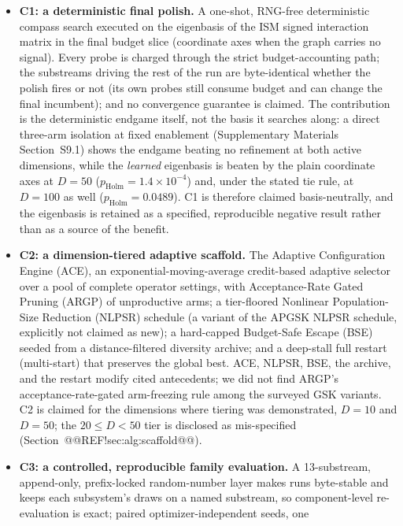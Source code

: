 \documentclass[10pt,a4paper]{article}
\begin{document}
\begin{itemize}[leftmargin=*,labelsep=4.9mm]
\item \textbf{C1: a deterministic final polish.} A one-shot, RNG-free
  deterministic compass search executed on the eigenbasis of the ISM
  signed interaction matrix in the final budget slice (coordinate axes
  when the graph carries no signal). Every probe is charged through
  the strict budget-accounting path; the substreams driving the rest of
  the run are byte-identical whether the polish fires or not (its own
  probes still consume budget and can change the final incumbent); and
  no convergence guarantee is claimed. The contribution is the deterministic
  endgame itself, not the basis it searches along: a direct three-arm isolation
  at fixed enablement (Supplementary Materials
  Section~S9.1) shows the endgame beating no refinement at
  both active dimensions, while the \emph{learned} eigenbasis is beaten by the
  plain coordinate axes at $D = 50$ ($p_{\mathrm{Holm}} = 1.4\times10^{-4}$)
  and, under the stated tie rule, at $D = 100$ as well
  ($p_{\mathrm{Holm}} = 0.0489$). C1 is therefore claimed
  basis-neutrally, and the eigenbasis is retained as a specified, reproducible
  negative result rather than as a source of the
  benefit. 
\item \textbf{C2: a dimension-tiered adaptive scaffold.} The
  Adaptive Configuration Engine (ACE), an exponential-moving-average
  credit-based adaptive selector over a pool of complete operator settings, with
  Acceptance-Rate Gated Pruning (ARGP) of unproductive arms; a
  tier-floored Nonlinear Population-Size Reduction (NLPSR) schedule
  (a variant of the APGSK NLPSR schedule, explicitly not claimed
  as new); a hard-capped Budget-Safe Escape (BSE) seeded from a distance-filtered
  diversity archive; and a deep-stall full restart (multi-start) that
  preserves the global best.
  ACE, NLPSR, BSE, the archive, and the restart modify cited
  antecedents; we did not find ARGP's acceptance-rate-gated arm-freezing
  rule among the surveyed GSK variants. C2 is claimed for the dimensions where
  tiering was demonstrated, $D = 10$ and $D = 50$; the $20 \leq D < 50$ tier is
  disclosed as mis-specified (Section~@@REF!sec:alg:scaffold@@). 
\item \textbf{C3: a controlled, reproducible family evaluation.} A
  13-substream, append-only, prefix-locked random-number layer makes
  runs byte-stable and keeps each subsystem's draws on a named
  substream, so component-level re-evaluation is exact; paired optimizer-independent seeds, one

\end{itemize}
\end{document}
